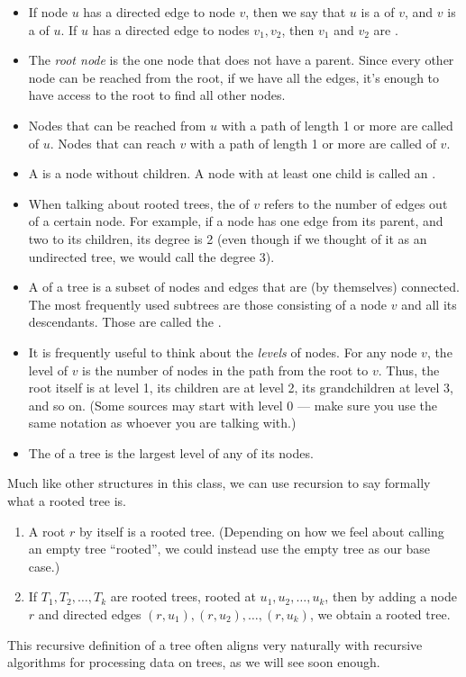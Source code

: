\begin{itemize}
\item If node $u$ has a directed edge to node $v$, then we say that
  $u$ is a  of $v$, and $v$ is a  of $u$.
  If $u$ has a directed edge to nodes $v_1, v_2$, then $v_1$ and $v_2$
  are .
\item The \emph{root node} is the one node that does not have a
  parent. Since every other node can be reached from the root, if we
  have all the edges, it's enough to have access to the root to find
  all other nodes.
\item Nodes that can be reached from $u$ with a path of length 1 or
  more are called  of $u$. 
  Nodes that can reach $v$ with a path of length 1 or more are called
   of $v$.
\item A  is a node without children. A node with at least
  one child is called an . 
\item When talking about rooted trees, the  of $v$ refers
  to the number of edges out of a certain node. 
  For example, if a node has one edge from its parent, and two to its
  children, its degree is 2 (even though if we thought of it as an
  undirected tree, we would call the degree 3).
\item A  of a tree is a subset of nodes and edges that
  are (by themselves) connected.
  The most frequently used subtrees are those consisting of a node $v$
  and all its descendants. 
  Those are called the .
\item It is frequently useful to think about the \emph{levels} of nodes.
  For any node $v$, the level of $v$ is the number of nodes in the
  path from the root to $v$. Thus, the root itself is at level 1, its
  children are at level 2, its grandchildren at level 3, and so on.
  (Some sources may start with level 0 --- make sure you use the
  same notation as whoever you are talking with.)
\item The  of a tree is the largest level of any of its
  nodes.
\end{itemize}

Much like other structures in this class, we can use recursion to say
formally what a rooted tree is.
\begin{enumerate}
\item A root $r$ by itself is a rooted tree. 
(Depending on how we feel about calling an empty tree ``rooted'', we
could instead use the empty tree as our base case.)
\item If $T_1, T_2, \ldots, T_k$ are rooted trees, 
rooted at $u_1, u_2, \ldots, u_k$, 
then by adding a node $r$ and directed edges
$(r,u_1), (r,u_2), \ldots, (r,u_k)$, we obtain a rooted tree.
\end{enumerate}
This recursive definition of a tree often aligns very naturally with
recursive algorithms for processing data on trees, as we will see soon
enough.

